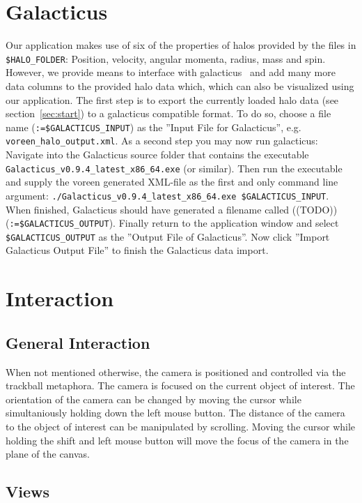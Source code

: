 \documentclass[
    fontsize=12pt,
    paper=a4,
    pagesize=auto,
    parskip=false,
    titlepage=on,
    english
]{scrartcl}
\newcommand{\inlinecode}{\texttt}
\begin{document}
\section{Galacticus}
\label{sec:galacticus}
Our application makes use of six of the properties of halos provided by the files in \inlinecode{\$HALO\_FOLDER}: Position, velocity, angular momenta, radius, mass and spin.
However, we provide means to interface with galacticus~\cite{galacticus} and add many more data columns to the provided halo data which, which can also be visualized using our application.
The first step is to export the currently loaded halo data (see section~\ref{sec:start}) to a galacticus compatible format.
To do so, choose a file name (\inlinecode{:=\$GALACTICUS\_INPUT}) as the ''Input File for Galacticus'', e.g. \inlinecode{voreen\_halo\_output.xml}.
As a second step you may now run galacticus: Navigate into the Galacticus source folder that contains the executable \inlinecode{Galacticus\_v0.9.4\_latest\_x86\_64.exe} (or similar).
Then run the executable and supply the voreen generated XML-file as the first and only command line argument: \inlinecode{./Galacticus\_v0.9.4\_latest\_x86\_64.exe \$GALACTICUS\_INPUT}.
When finished, Galacticus should have generated a filename called ((TODO)) (\inlinecode{:=\$GALACTICUS\_OUTPUT}).
Finally return to the application window and select \inlinecode{\$GALACTICUS\_OUTPUT} as the ''Output File of Galacticus''.
Now click ''Import Galacticus Output File'' to finish the Galacticus data import.

\section{Interaction}
\label{sec:interaction}
\subsection{General Interaction}
When not mentioned otherwise, the camera is positioned and controlled via the trackball metaphora.
The camera is focused on the current object of interest.
The orientation of the camera can be changed by moving the cursor while simultaniously holding down the left mouse button.
The distance of the camera to the object of interest can be manipulated by scrolling.
Moving the cursor while holding the shift and left mouse button will move the focus of the camera in the plane of the canvas.

\subsection{Views}
\end{document}
